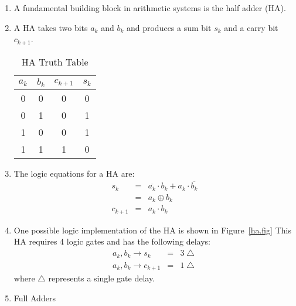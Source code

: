 \documentclass[times, twocolumn, 10pt]{article}
\begin{document}
\begin{enumerate}
  \begin{enumerate}
  \item A fundamental building block in arithmetic systems is the half
    adder (HA). 
  \item A HA takes two bits $a_{k}$ and $b_{k}$ and produces a sum bit
    $s_{k}$ and
    a carry bit $c_{k+1}$. 
    \begin{table} [h]
      \centering
      \label{ha.tbl}
      \begin{tabular}{|c|c||c|c|} \hline
	$a_{k}$ & $b_{k}$ & $c_{k+1}$ & $s_{k}$  \\ \hline \hline
        0    &    0    &    0       &   0      \\ \hline
        0    &    1    &    0       &   1      \\ \hline
        1    &    0    &    0       &   1      \\ \hline
        1    &    1    &    1       &   0      \\ \hline
      \end{tabular}
      \caption{HA Truth Table}
    \end{table}
  \item The logic equations for a HA are:
    \begin{eqnarray*}
      s_{k}  & = & \overline{a_{k}} \cdot b_{k} + a_{k} \cdot \overline{b_{k}} \\
      & = & a_{k} \oplus b_{k} \\
      c_{k+1}  & = &  a_{k} \cdot b_{k} 
    \end{eqnarray*}
  \item One possible logic implementation of the HA is shown in
    Figure~\ref{ha.fig}
    This HA requires 4 logic gates and has the following delays: 
    \begin{eqnarray*}
      a_{k}, b_{k} \rightarrow s_{k} & = & 3 \bigtriangleup \\
      a_{k}, b_{k} \rightarrow c_{k+1} & = & 1 \bigtriangleup
    \end{eqnarray*}
    where $\bigtriangleup$ represents a single gate delay.  
    \begin{figure*}
      \label{ha.fig}
      \begin{center}
	\setlength{\unitlength}{0.0105in}%
      \end{center}
      \caption{HA Implementation.}
    \end{figure*}
  \item Full Adders
    \begin{enumerate}

\end{enumerate}
\end{enumerate}
\end{enumerate}
\end{document}
